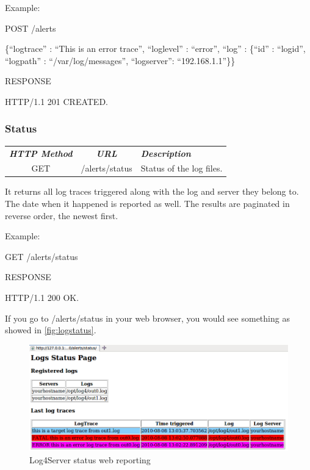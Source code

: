 \noindent
Example:

\begin{codeexample}

POST /alerts

 \{``logtrace'' : ``This is an error trace'', 
   ``loglevel'' : ``error'',
   ``log'' : \{``id'' : ``logid'', ``logpath'' : ``/var/log/messages'', ``logserver'': 
``192.168.1.1''\}\} 

RESPONSE

HTTP/1.1 201 CREATED.
\end{codeexample}

\subsubsection{Status}

\begin{flushleft}
 \begin{tabular}{|c|c|l|}
 \hline 
 \rowcolor{cyan} {\color{white} \textit{\textbf{HTTP Method}}} &  {\color{white} 
  \textit{\textbf{URL}}}  & {\color{white} 
 \textit{\textbf{Description}}}\\
 GET & /alerts/status & Status of the log files.\\
 \hline
\end{tabular}
\end{flushleft}
It returns all log traces triggered along with the log and server they belong to. The 
date when it happened is reported as well. The results are paginated in reverse
order, the newest first.

\noindent
Example:

\begin{codeexample}

GET /alerts/status

RESPONSE

HTTP/1.1 200 OK.
\end{codeexample}


\noindent
If you go to /alerts/status in your web browser, you would see something as showed in  
\autoref{fig:logstatus}.

\begin{figure}[ht]
\includegraphics[scale=0.50]{logstatus.png}
\caption{Log4Server status web reporting}\label{fig:logstatus}
\end{figure}

